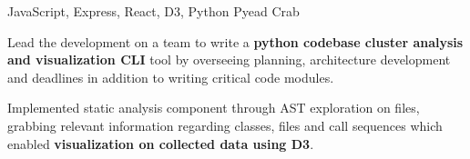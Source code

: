 

\begin{cventries}

    \cventry
    {JavaScript, Express, React, D3, Python} %
    {Pyead Crab \hspace{0.2cm} \hspace{0.2cm}} %
    {} %
    {} %
    {
      \begin{cvitems} %
        \item {Lead the development on a team to write a \textbf{python codebase cluster analysis and visualization CLI} tool by overseeing planning, architecture development and deadlines in addition to writing critical code modules.}
        \item {Implemented static analysis component through AST exploration on files, grabbing relevant information regarding classes, files and call sequences which enabled \textbf{visualization on collected data using D3}.}
      \end{cvitems}
    }
    


\end{cventries}
